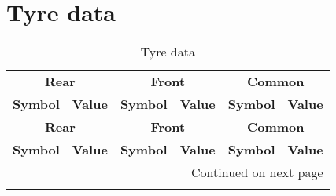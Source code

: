 \section{Tyre data}
%
\begin{longtable}{cccccc}
    \caption{Tyre data} \label{tab:TyreData} \\
    \hline \multicolumn{2}{c}{\textbf{Rear}} & \multicolumn{2}{c}{\textbf{Front}} & \multicolumn{2}{c}{\textbf{Common}}\\
    \multicolumn{1}{c}{\textbf{Symbol}} & \multicolumn{1}{c}{\textbf{Value}} & \multicolumn{1}{c}{\textbf{Symbol}} & \multicolumn{1}{c}{\textbf{Value}} & \multicolumn{1}{c}{\textbf{Symbol}} & \multicolumn{1}{c}{\textbf{Value}} \\ \hline
    \endfirsthead

    \hline \multicolumn{2}{c}{\textbf{Rear}} & \multicolumn{2}{c}{\textbf{Front}} & \multicolumn{2}{c}{\textbf{Common}}\\
    \multicolumn{1}{c}{\textbf{Symbol}} & \multicolumn{1}{c}{\textbf{Value}} & \multicolumn{1}{c}{\textbf{Symbol}} & \multicolumn{1}{c}{\textbf{Value}} & \multicolumn{1}{c}{\textbf{Symbol}} & \multicolumn{1}{c}{\textbf{Value}} \\ \hline
    \endhead

    \hline \multicolumn{6}{r}{{Continued on next page}} \\ \hline
    \endfoot


\end{longtable}
